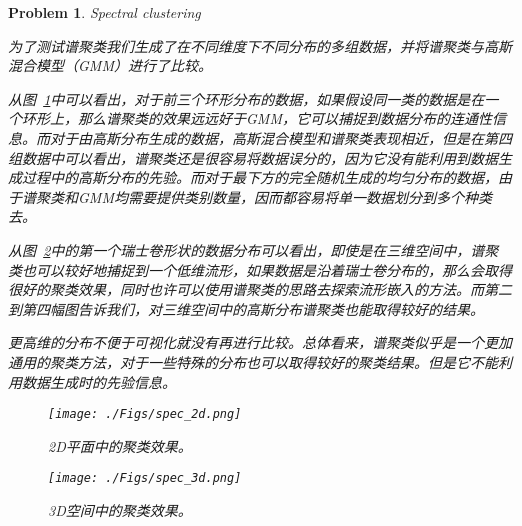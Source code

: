 \documentclass[UTF8]{article}
\makeatletter
\newtheorem{hw}{Problem}
\newenvironment{sol}
\renewcommand{\caption}[2][\relax]{%

			{\raggedright\textbf{\ALG@name~\thealgorithm} ##2\par}%

			\ifx\relax##1\relax %

			\addcontentsline{loa}{algorithm}{\protect\numberline{\thealgorithm}##2}%

			\else %

			\addcontentsline{loa}{algorithm}{\protect\numberline{\thealgorithm}##1}%

			\fi

			\kern2pt\hrule\kern2pt

		}
\makeatother
\begin{document}
\begin{hw}

	Spectral clustering



	\begin{sol}

		为了测试谱聚类我们生成了在不同维度下不同分布的多组数据，并将谱聚类与高斯混合模型（GMM）进行了比较。

		

		从图~\ref{fig:spec_2d}中可以看出，对于前三个环形分布的数据，如果假设同一类的数据是在一个环形上，那么谱聚类的效果远远好于GMM，它可以捕捉到数据分布的连通性信息。而对于由高斯分布生成的数据，高斯混合模型和谱聚类表现相近，但是在第四组数据中可以看出，谱聚类还是很容易将数据误分的，因为它没有能利用到数据生成过程中的高斯分布的先验。而对于最下方的完全随机生成的均匀分布的数据，由于谱聚类和GMM均需要提供类别数量，因而都容易将单一数据划分到多个种类去。

		

		从图~\ref{fig:spec_3d}中的第一个瑞士卷形状的数据分布可以看出，即使是在三维空间中，谱聚类也可以较好地捕捉到一个低维流形，如果数据是沿着瑞士卷分布的，那么会取得很好的聚类效果，同时也许可以使用谱聚类的思路去探索流形嵌入的方法。而第二到第四幅图告诉我们，对三维空间中的高斯分布谱聚类也能取得较好的结果。

		

		更高维的分布不便于可视化就没有再进行比较。总体看来，谱聚类似乎是一个更加通用的聚类方法，对于一些特殊的分布也可以取得较好的聚类结果。但是它不能利用数据生成时的先验信息。

		

		\begin{figure}

			\centering

			\vspace{-0.3cm}

			\texttt{[image: ./Figs/spec\_2d.png]}

			\caption{2D平面中的聚类效果。}

			\label{fig:spec_2d}

		\end{figure}

		\begin{figure}

			\centering

			\vspace{-0.3cm}

			\texttt{[image: ./Figs/spec\_3d.png]}

			\caption{3D空间中的聚类效果。}

			\label{fig:spec_3d}

		\end{figure}

	\end{sol}	

\end{hw}
\end{document}
